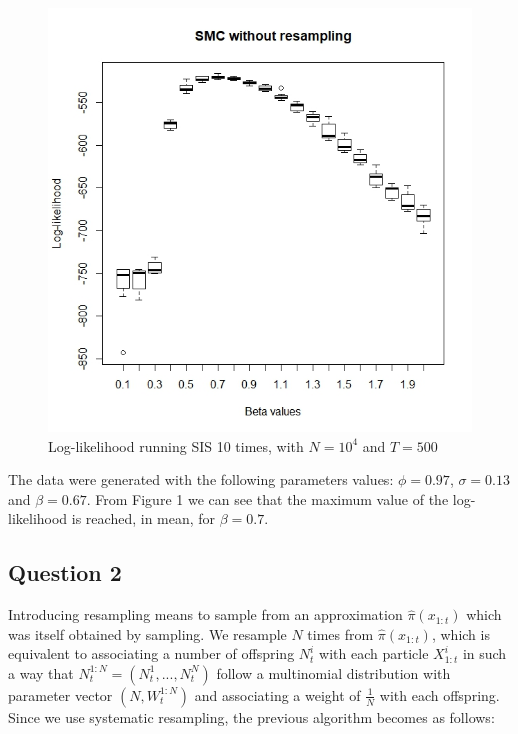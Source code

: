 \documentclass[]{article}
\begin{document}
	\begin{figure}
		\includegraphics[width=\columnwidth]{task1/SIS_N_10000_T_500.jpeg}
		\caption{Log-likelihood running SIS 10 times, with $N=10^4$ and $T=500$}
	\end{figure}
	The data were generated with the following parameters values: $\phi = 0.97$, $\sigma=0.13$ and $\beta=0.67$. From Figure 1 we can see that the maximum value of the log-likelihood is reached, in mean, for $\beta=0.7$.
	
	\subsection*{Question 2}
	Introducing resampling means to sample from an approximation $\hat{\pi}(x_{1:t})$ which was itself obtained by sampling. We resample $N$ times from $\hat{\pi}(x_{1:t})$, which is equivalent to associating a number of offspring $N_t^i$ with each particle $X_{1:t}^i$ in such a way that $N_t^{1:N} = (N_t^1, ..., N_t^N)$ follow a multinomial distribution with parameter vector $(N, W_t^{1:N})$ and associating a weight of $\frac{1}{N}$ with each offspring. Since we use systematic resampling, the previous algorithm becomes as follows:
	
\end{document}
